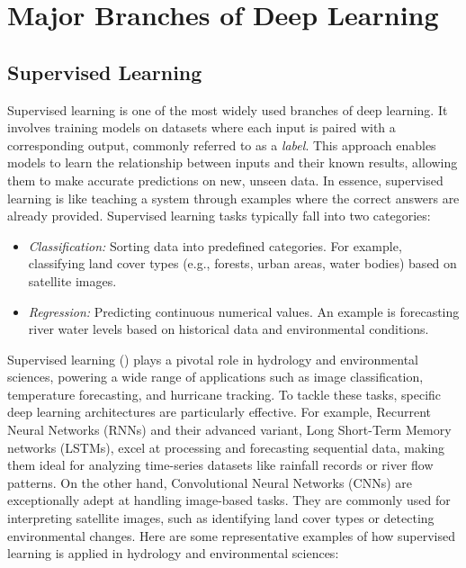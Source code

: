 
\section{Major Branches of Deep Learning}
\subsection{Supervised Learning}
Supervised learning is one of the most widely used branches of deep learning. It involves training models on datasets where each input is paired with a corresponding output, commonly referred to as a \textit{label}. This approach enables models to learn the relationship between inputs and their known results, allowing them to make accurate predictions on new, unseen data. In essence, supervised learning is like teaching a system through examples where the correct answers are already provided.
Supervised learning tasks typically fall into two categories:
\begin{itemize}
\item \textit{Classification:} Sorting data into predefined categories. For example, classifying land cover types (e.g., forests, urban areas, water bodies) based on satellite images.
\item \textit{Regression:} Predicting continuous numerical values. An example is forecasting river water levels based on historical data and environmental conditions.
\end{itemize}
Supervised learning () plays a pivotal role in hydrology and environmental sciences, powering a wide range of applications such as image classification, temperature forecasting, and hurricane tracking. To tackle these tasks, specific deep learning architectures are particularly effective. For example, Recurrent Neural Networks (RNNs) and their advanced variant, Long Short-Term Memory networks (LSTMs), excel at processing and forecasting sequential data, making them ideal for analyzing time-series datasets like rainfall records or river flow patterns. On the other hand, Convolutional Neural Networks (CNNs) are exceptionally adept at handling image-based tasks. They are commonly used for interpreting satellite images, such as identifying land cover types or detecting environmental changes.
Here are some representative examples of how supervised learning is applied in hydrology and environmental sciences:
